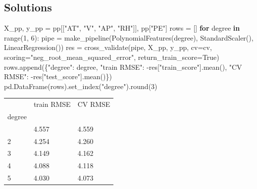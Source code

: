 \documentclass[
  letterpaper,
  DIV=11,
  numbers=noendperiod]{scrreprt}
\newenvironment{Shaded}{\begin{snugshade}}{\end{snugshade}}
\newcommand{\BuiltInTok}[1]{\textcolor[rgb]{0.00,0.23,0.31}{#1}}
\newcommand{\ControlFlowTok}[1]{\textcolor[rgb]{0.00,0.23,0.31}{\textbf{#1}}}
\newcommand{\DecValTok}[1]{\textcolor[rgb]{0.68,0.00,0.00}{#1}}
\newcommand{\KeywordTok}[1]{\textcolor[rgb]{0.00,0.23,0.31}{\textbf{#1}}}
\newcommand{\NormalTok}[1]{\textcolor[rgb]{0.00,0.23,0.31}{#1}}
\newcommand{\OperatorTok}[1]{\textcolor[rgb]{0.37,0.37,0.37}{#1}}
\newcommand{\StringTok}[1]{\textcolor[rgb]{0.13,0.47,0.30}{#1}}
\newcommand{\VariableTok}[1]{\textcolor[rgb]{0.07,0.07,0.07}{#1}}
\begin{document}
\subsection{Solutions}\label{solutions-6}

\begin{tcolorbox}[enhanced jigsaw, left=2mm, title=\textcolor{quarto-callout-caution-color}{\faFire}\hspace{0.5em}{Solution to Exercise 1}, opacityback=0, breakable, rightrule=.15mm, arc=.35mm, toptitle=1mm, colbacktitle=quarto-callout-caution-color!10!white, opacitybacktitle=0.6, coltitle=black, colframe=quarto-callout-caution-color-frame, bottomrule=.15mm, leftrule=.75mm, bottomtitle=1mm, titlerule=0mm, toprule=.15mm, colback=white]

\begin{Shaded}
\begin{Highlighting}[]
\NormalTok{X\_pp, y\_pp }\OperatorTok{=}\NormalTok{ pp[[}\StringTok{"AT"}\NormalTok{, }\StringTok{"V"}\NormalTok{, }\StringTok{"AP"}\NormalTok{, }\StringTok{"RH"}\NormalTok{]], pp[}\StringTok{"PE"}\NormalTok{]}
\NormalTok{rows }\OperatorTok{=}\NormalTok{ []}
\ControlFlowTok{for}\NormalTok{ degree }\KeywordTok{in} \BuiltInTok{range}\NormalTok{(}\DecValTok{1}\NormalTok{, }\DecValTok{6}\NormalTok{):}
\NormalTok{    pipe }\OperatorTok{=}\NormalTok{ make\_pipeline(PolynomialFeatures(degree), StandardScaler(), LinearRegression())}
\NormalTok{    res }\OperatorTok{=}\NormalTok{ cross\_validate(pipe, X\_pp, y\_pp, cv}\OperatorTok{=}\NormalTok{cv, scoring}\OperatorTok{=}\StringTok{"neg\_root\_mean\_squared\_error"}\NormalTok{,}
\NormalTok{                         return\_train\_score}\OperatorTok{=}\VariableTok{True}\NormalTok{)}
\NormalTok{    rows.append(\{}\StringTok{"degree"}\NormalTok{: degree, }\StringTok{"train RMSE"}\NormalTok{: }\OperatorTok{{-}}\NormalTok{res[}\StringTok{"train\_score"}\NormalTok{].mean(),}
                 \StringTok{"CV RMSE"}\NormalTok{: }\OperatorTok{{-}}\NormalTok{res[}\StringTok{"test\_score"}\NormalTok{].mean()\})}
\NormalTok{pd.DataFrame(rows).set\_index(}\StringTok{"degree"}\NormalTok{).}\BuiltInTok{round}\NormalTok{(}\DecValTok{3}\NormalTok{)}
\end{Highlighting}
\end{Shaded}

\begin{longtable}[]{@{}lll@{}}
\toprule\noalign{}
& train RMSE & CV RMSE \\
degree & & \\
\midrule\noalign{}
\endhead
\bottomrule\noalign{}
\endlastfoot
1 & 4.557 & 4.559 \\
2 & 4.254 & 4.260 \\
3 & 4.149 & 4.162 \\
4 & 4.088 & 4.118 \\
5 & 4.030 & 4.073 \\
\end{longtable}


\end{tcolorbox}
\end{document}
